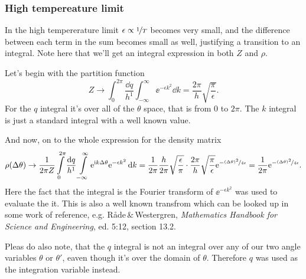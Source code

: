 \documentclass[11pt,letter, swedish, english
]{article}
\begin{document}
\subsubsection{High tempereature limit}
In the high tempererature limit $\epsilon\propto\nicefrac{1}{T}$
becomes very small, and the difference between each term in the sum
becomes small as well, justifying a transition to an integral. Note
here that we'll get an integral expression in both $Z$ and $\rho$.

Let's begin with the partition function
\begin{equation}
Z\to \int_0^{2\pi}\frac{\dd{q}}{h^1}\int_{-\infty}^\infty\ee^{-\epsilon k^2} \dd{k} 
= \frac{2\pi}{h}\sqrt{\frac{\pi}{\epsilon}}.
\end{equation}
For the $q$ integral it's over all of the $\theta$ space, that is from
$0$ to $2\pi$. 
The $k$ integral is just a standard integral with a well known
value. 

And now, on to the whole expression for the density matrix
\begin{equation}\label{eq:4_hi_temp}
\rho(\Delta\theta) \to \frac{1}{2\pi Z}
\int_0^{2\pi}\frac{\dd{q}}{h^1}
\int_{-\infty}^\infty\ee^{\ii k\Delta\theta}\ee^{-\epsilon k^2} \dd{k} 
= \frac{1}{2\pi}\frac{h}{2\pi}\sqrt{\frac{\epsilon}{\pi}}\cdot
\frac{2\pi}{h}\sqrt{\frac{\pi}{\epsilon}}\ee^{-\nicefrac{(\Delta\theta)^2}{4\epsilon}}
= \frac{1}{2\pi}\ee^{-\nicefrac{(\Delta\theta)^2}{4\epsilon}}.
\end{equation}
Here the fact that the integral is the Fourier transform of
$\ee^{-\epsilon k^2}$ was used to evaluate the it. This is also
a well known transfrom which can be looked up in some work of
reference, e.g. Råde\,\&\,Westergren, \textit{Mathematics Handbook for
Science and Engineering}, ed. 5:12, section 13.2.

Pleas do also note, that the $q$ integral is not an integral over
any of our two angle variables $\theta$ or $\theta'$, eaven though
it's over the domain of $\theta$. Therefore $q$ was used as the
integration variable instead. 
\end{document}
